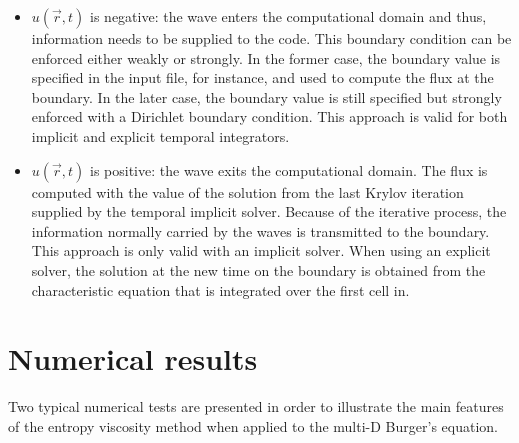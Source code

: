 \begin{itemize}
\item $u(\vec{r},t) $ is negative: the wave enters the computational domain and thus, information needs to be supplied to the code. This boundary condition can be enforced either weakly or strongly. In the former case, the boundary value is specified in the input file, for instance, and used to compute the flux at the boundary. In the later case, the boundary value is still specified but strongly enforced with a Dirichlet boundary condition. This approach is valid for both implicit and explicit temporal integrators.
\item $u(\vec{r},t) $ is positive: the wave exits the computational domain. The flux is computed with the value of the solution from the last Krylov iteration supplied by the temporal implicit solver. Because of the iterative process, the information normally carried by the waves is transmitted to the boundary. This approach is only valid with an implicit solver. When using an explicit solver, the solution at the new time on the boundary is obtained from the characteristic equation that is integrated over the first cell in.
\end{itemize}
 

\section{Numerical results}\label{sec:num_sct2b}
Two typical numerical tests are presented in order to illustrate the main features of the entropy viscosity method when applied to the multi-D Burger's equation.
